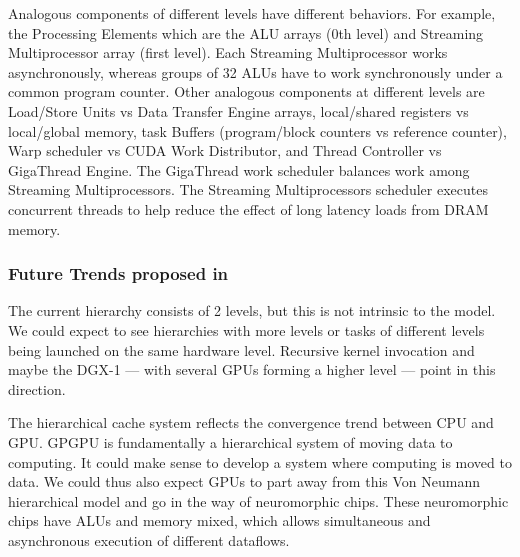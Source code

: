 Analogous components of different levels have different behaviors.
For example, the Processing Elements which are the ALU arrays (0th level) and Streaming Multiprocessor array (first level).
Each Streaming Multiprocessor works asynchronously, whereas groups of 32 ALUs have to work synchronously under a common program counter.
Other analogous components at different levels are Load/Store Units vs Data Transfer Engine arrays, local/shared registers vs local/global memory,
task Buffers (program/block counters vs reference counter), Warp scheduler vs CUDA Work Distributor, and Thread Controller vs GigaThread Engine.
The GigaThread work scheduler balances work among Streaming Multiprocessors.
The Streaming Multiprocessors scheduler executes concurrent threads to help reduce the effect of long latency loads from DRAM memory.

\subsubsection{Future Trends proposed in \cite{Hu:2016:CLG:2891449.2873053}}

The current hierarchy consists of 2 levels, but this is not intrinsic to the model.
We could expect to see hierarchies with more levels or tasks of different levels being launched on the same hardware level.
Recursive kernel invocation and maybe the DGX-1 --- with several GPUs forming a higher level --- point in this direction.

The hierarchical cache system reflects the convergence trend between CPU and GPU.
GPGPU is fundamentally a hierarchical system of moving data to computing.
It could make sense to develop a system where computing is moved to data.
We could thus also expect GPUs to part away from this Von Neumann hierarchical model and go in the way of neuromorphic chips.
These neuromorphic chips have ALUs and memory mixed, which allows simultaneous and asynchronous execution of different dataflows.
